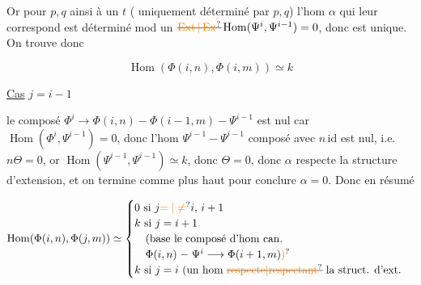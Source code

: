 Or pour $p,q$  ainsi à un $t$ ( uniquement déterminé par $p,q$) l'hom $\alpha$ qui leur correspond est déterminé mod un $\deleted{\unsure{\operatorname{Ext}|\operatorname{Ex}}}\operatorname{Hom}(\Psi^i,\Psi^{i-1})=0$, donc est unique. On trouve donc

\[ \operatorname{Hom}(\Phi(i,n),\Phi(i,m))\simeq k \]


\uline{Cas} $j=i-1$


le composé $\Phi^i\longrightarrow\Phi(i,n)\mathrel{-}\Phi(i-1,m)\mathrel{-}\Psi^{i-1}$ est nul car $\operatorname{Hom}(\Phi^i,\Psi^{i-1})=0$, donc l'hom   $\Psi^{i-1}\mathrel{-}\Psi^{i-1}$ composé avec $n\,\mathrm{id}$ est nul, i.e. $n\Theta=0$, or $\operatorname{Hom}(\Psi^{i-1},\Psi^{i-1})\simeq k$, donc $\Theta=0$, donc $\alpha$ respecte la structure d'extension, et on termine comme plus haut pour conclure $\alpha=0$. Donc en résumé

\[
\operatorname{Hom}(\Phi(i,n),\Phi(j,m))\simeq
\begin{cases}
0\ \text{si } j\unsure{=|\ne}i,\,i+1\\
k\ \text{si }j=i+1\\
\quad(\text{base le composé d'hom can.}\\
\quad\Phi(i,n)\mathrel{-}\Psi^i\longrightarrow\Phi(i+1,m)\unsure{)}\\
k\ \text{si }j=i\ (\text{un hom }\deleted{\text{\unsure{respecte|respectant}}}\ \text{la struct. d'ext.}
\end{cases}
\]


